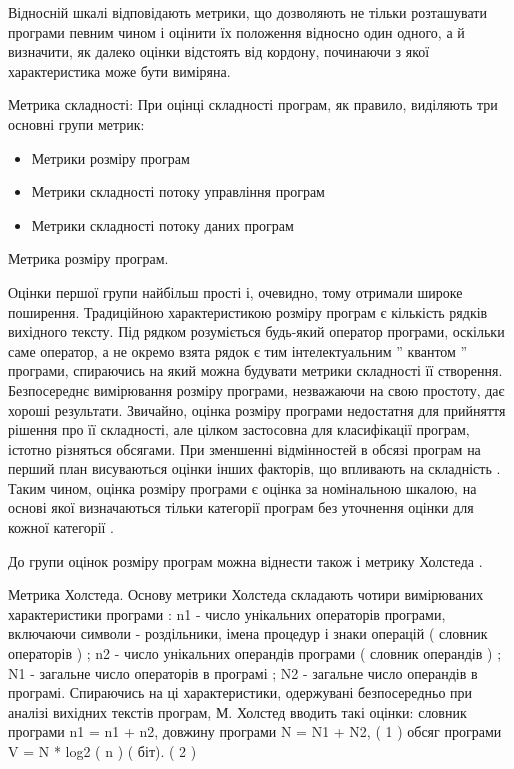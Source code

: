 Відносній шкалі відповідають метрики, що дозволяють не тільки розташувати програми певним чином і оцінити їх положення відносно один одного, а й визначити, як далеко оцінки відстоять від кордону, починаючи з якої характеристика може бути виміряна.

Метрика складності:
При оцінці складності програм, як правило, виділяють три основні групи метрик:
\begin{itemize}
\item {} 
Метрики розміру програм

\item {} 
Метрики складності потоку управління програм

\item {} 
Метрики складності потоку даних програм

\end{itemize}

Метрика розміру програм.

Оцінки першої групи найбільш прості і, очевидно, тому отримали широке поширення. Традиційною характеристикою розміру програм є кількість рядків вихідного тексту. Під рядком розуміється будь-який оператор програми, оскільки саме оператор, а не окремо взята рядок є тим інтелектуальним '' квантом '' програми, спираючись на який можна будувати метрики складності її створення.
Безпосереднє вимірювання розміру програми, незважаючи на свою простоту, дає хороші результати. Звичайно, оцінка розміру програми недостатня для прийняття рішення про її складності, але цілком застосовна для класифікації програм, істотно різняться обсягами. При зменшенні відмінностей в обсязі програм на перший план висуваються оцінки інших факторів, що впливають на складність . Таким чином, оцінка розміру програми є оцінка за номінальною шкалою, на основі якої визначаються тільки категорії програм без уточнення оцінки для кожної категорії .

До групи оцінок розміру програм можна віднести також і метрику Холстеда .

Метрика Холстеда.
Основу метрики Холстеда складають чотири вимірюваних характеристики програми :
n1 - число унікальних операторів програми, включаючи символи -
роздільники, імена процедур і знаки операцій ( словник операторів ) ;
n2 - число унікальних операндів програми ( словник операндів ) ;
N1 - загальне число операторів в програмі ;
N2 - загальне число операндів в програмі.
Спираючись на ці характеристики, одержувані безпосередньо при аналізі вихідних текстів програм, М. Холстед вводить такі оцінки:
словник програми
 n1 = n1 + n2,
довжину програми
 N = N1 + N2, ( 1 )
обсяг програми
 V = N * log2 ( n ) ( біт). ( 2 )

